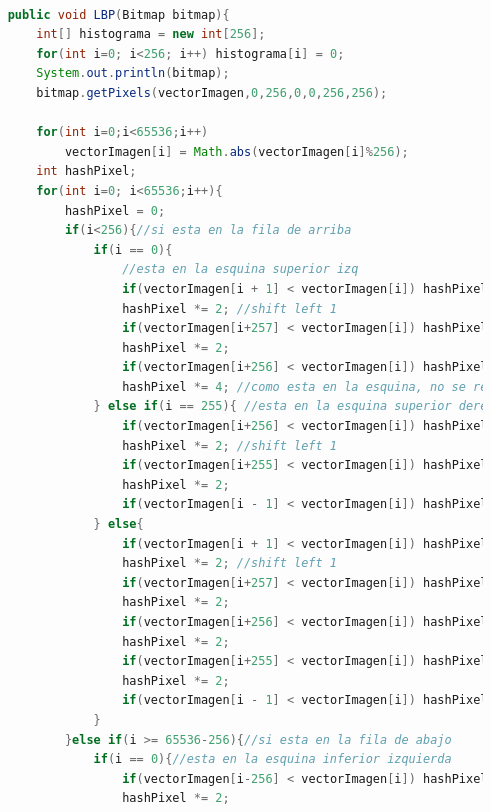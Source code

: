 \documentclass[12pt,twocolumn,letterpaper]{article}
\begin{document}
\begin{lstlisting}[language=Java]

    public void LBP(Bitmap bitmap){
        int[] histograma = new int[256];
        for(int i=0; i<256; i++) histograma[i] = 0;
        System.out.println(bitmap);
        bitmap.getPixels(vectorImagen,0,256,0,0,256,256);

        for(int i=0;i<65536;i++)
            vectorImagen[i] = Math.abs(vectorImagen[i]%256);
        int hashPixel;
        for(int i=0; i<65536;i++){
            hashPixel = 0;
            if(i<256){//si esta en la fila de arriba
                if(i == 0){
                    //esta en la esquina superior izq
                    if(vectorImagen[i + 1] < vectorImagen[i]) hashPixel += 1; //pixel de derecha
                    hashPixel *= 2; //shift left 1
                    if(vectorImagen[i+257] < vectorImagen[i]) hashPixel += 1; // pixel de esquina inferior derecha
                    hashPixel *= 2;
                    if(vectorImagen[i+256] < vectorImagen[i]) hashPixel += 1; //pixel de abajo
                    hashPixel *= 4; //como esta en la esquina, no se revisan los dos ultimos.
                } else if(i == 255){ //esta en la esquina superior derecha
                    if(vectorImagen[i+256] < vectorImagen[i]) hashPixel += 1; //pixel de abajo
                    hashPixel *= 2; //shift left 1
                    if(vectorImagen[i+255] < vectorImagen[i]) hashPixel += 1;//pixel esquina inf izquierda
                    hashPixel *= 2;
                    if(vectorImagen[i - 1] < vectorImagen[i]) hashPixel += 1; //pixel izquierda
                } else{
                    if(vectorImagen[i + 1] < vectorImagen[i]) hashPixel += 1; //pixel de derecha
                    hashPixel *= 2; //shift left 1
                    if(vectorImagen[i+257] < vectorImagen[i]) hashPixel += 1; // pixel de esquina inferior derecha
                    hashPixel *= 2;
                    if(vectorImagen[i+256] < vectorImagen[i]) hashPixel += 1; //pixel de abajo
                    hashPixel *= 2;
                    if(vectorImagen[i+255] < vectorImagen[i]) hashPixel += 1; //pixel esquina inf izquierda
                    hashPixel *= 2;
                    if(vectorImagen[i - 1] < vectorImagen[i]) hashPixel += 1; //pixel izquierda
                }
            }else if(i >= 65536-256){//si esta en la fila de abajo
                if(i == 0){//esta en la esquina inferior izquierda
                    if(vectorImagen[i-256] < vectorImagen[i]) hashPixel += 1; //pixel arriba
                    hashPixel *= 2;

\end{lstlisting}
\end{document}
